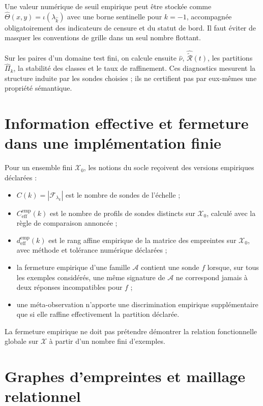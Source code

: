 \documentclass[11pt,a4paper]{article}
\theoremstyle{remark}
\newcommand{\X}{\mathcal X}
\newcommand{\F}{\mathcal F}
\begin{document}
Une valeur numérique de seuil empirique peut être stockée comme $\widehat\Theta(x,y)=\iota(\lambda_{\widehat k})$ avec une borne sentinelle pour $k=-1$, accompagnée obligatoirement des indicateurs de censure et du statut de bord. Il faut éviter de masquer les conventions de grille dans un seul nombre flottant.

Sur les paires d'un domaine test fini, on calcule ensuite $\widehat\nu$, $\widehat{\widetilde{\mathcal R}}(t)$, les partitions $\widehat\Pi_k$, la stabilité des classes et le taux de raffinement. Ces diagnostics mesurent la structure induite par les sondes choisies ; ils ne certifient pas par eux-mêmes une propriété sémantique.

\section{Information effective et fermeture dans une implémentation finie}

Pour un ensemble fini $\X_0$, les notions du socle reçoivent des versions empiriques déclarées :
\begin{itemize}
  \item $C(k)=|\F_{\lambda_k}|$ est le nombre de sondes de l'échelle ;
  \item $C_{\mathrm{eff}}^{\mathrm{emp}}(k)$ est le nombre de profils de sondes distincts sur $\X_0$, calculé avec la règle de comparaison annoncée ;
  \item $d_{\mathrm{eff}}^{\mathrm{emp}}(k)$ est le rang affine empirique de la matrice des empreintes sur $\X_0$, avec méthode et tolérance numérique déclarées ;
  \item la fermeture empirique d'une famille $\mathcal A$ contient une sonde $f$ lorsque, sur tous les exemples considérés, une même signature de $\mathcal A$ ne correspond jamais à deux réponses incompatibles pour $f$ ;
  \item une méta-observation n'apporte une discrimination empirique supplémentaire que si elle raffine effectivement la partition déclarée.
\end{itemize}

La fermeture empirique ne doit pas prétendre démontrer la relation fonctionnelle globale sur $\X$ à partir d'un nombre fini d'exemples.

\section{Graphes d'empreintes et maillage relationnel}
\end{document}
